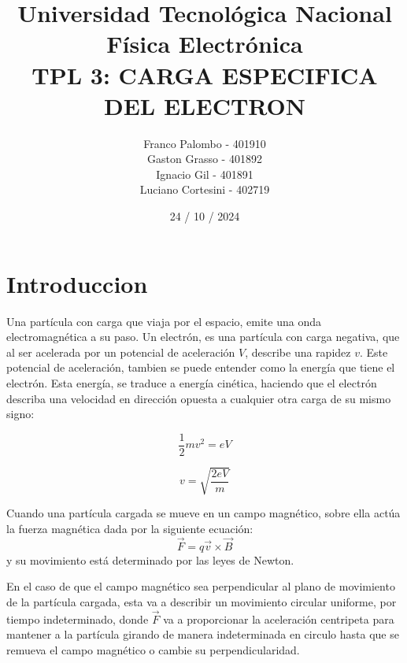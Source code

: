 \documentclass[a4paper,12pt]{report}
\title{
  \fontsize{25}{0}\selectfont Universidad Tecnológica Nacional\\
  \fontsize{22}{30}\selectfont Física Electrónica\\
  \fontsize{18}{25}\selectfont TPL 3: CARGA ESPECIFICA DEL ELECTRON\\
}
\author{
Franco Palombo - 401910\\
Gaston Grasso - 401892\\
Ignacio Gil - 401891\\
Luciano Cortesini - 402719\\
}
\date{24 / 10 / 2024}
\begin{document}
\maketitle

\chapter{Introduccion}

    Una partícula con carga que viaja por el espacio, emite una onda electromagnética a su paso. Un electrón, es una
    partícula con carga negativa, que al ser acelerada por un potencial de aceleración $V$, describe una rapidez $v$.
    Este potencial de aceleración, tambien se puede entender como la energía que tiene el electrón. Esta energía, se
    traduce a energía cinética, haciendo que el electrón describa una velocidad en dirección opuesta a cualquier otra
    carga de su mismo signo:
    \begin{figure}[h!]
        \centering
        \begin{minipage}{0.3\textwidth}
            \begin{equation*}
                \frac{1}{2} m v^2 = eV
            \end{equation*}
        \end{minipage}
        \begin{minipage}{0.3\textwidth}
            \begin{equation}
                \label{v.electron}
                v = \sqrt{\frac{2 eV}{m}}
            \end{equation}
        \end{minipage}
    \end{figure}

    Cuando una partícula cargada se mueve en un campo magnético, sobre ella actúa la fuerza magnética dada por la
    siguiente ecuación:
    \begin{equation}
        \vec{F} = q \vec{v} \times \vec{B}
    \end{equation}
    y su movimiento está determinado por las leyes de Newton.

    En el caso de que el campo magnético sea perpendicular al plano de movimiento de la partícula cargada, esta
    va a describir un movimiento circular uniforme, por tiempo indeterminado, donde $\vec{F}$ va a proporcionar la
    aceleración centripeta para mantener a la partícula girando de manera indeterminada en circulo hasta que se
    remueva el campo magnético o cambie su perpendicularidad.
\end{document}

